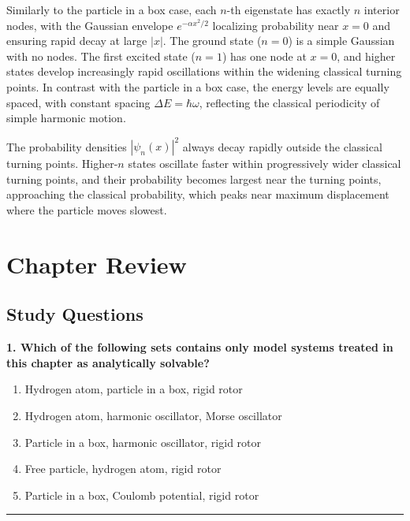 \documentclass[
  english,
  9pt,
]{extbook}
\providecommand{\tightlist}{%
  \setlength{\itemsep}{0pt}\setlength{\parskip}{0pt}}
\theoremstyle{definition}
\theoremstyle{definition}
\theoremstyle{definition}
\theoremstyle{definition}
\theoremstyle{remark}
\begin{document}
Similarly to the particle in a box case, each \(n\)-th eigenstate has exactly \(n\) interior nodes, with the Gaussian envelope \(e^{-\alpha x^2/2}\) localizing probability near \(x=0\) and ensuring rapid decay at large \(|x|\). The ground state (\(n=0\)) is a simple Gaussian with no nodes. The first excited state (\(n=1\)) has one node at \(x=0\), and higher states develop increasingly rapid oscillations within the widening classical turning points. In contrast with the particle in a box case, the energy levels are equally spaced, with constant spacing \(\Delta E = \hbar \omega\), reflecting the classical periodicity of simple harmonic motion.

The probability densities \(|\psi_n(x)|^2\) always decay rapidly outside the classical turning points. Higher-\(n\) states oscillate faster within progressively wider classical turning points, and their probability becomes largest near the turning points, approaching the classical probability, which peaks near maximum displacement where the particle moves slowest.

\section{Chapter Review}\label{rev4}

\subsection{Study Questions}\label{quest4}

\textbf{1. Which of the following sets contains only model systems treated in this chapter as analytically solvable?}

\begin{enumerate}
\def\labelenumi{\alph{enumi}.}
\tightlist
\item
  Hydrogen atom, particle in a box, rigid rotor\\
\item
  Hydrogen atom, harmonic oscillator, Morse oscillator\\
\item
  Particle in a box, harmonic oscillator, rigid rotor\\
\item
  Free particle, hydrogen atom, rigid rotor\\
\item
  Particle in a box, Coulomb potential, rigid rotor
\end{enumerate}

\begin{center}\rule{0.5\linewidth}{0.5pt}\end{center}
\end{document}
